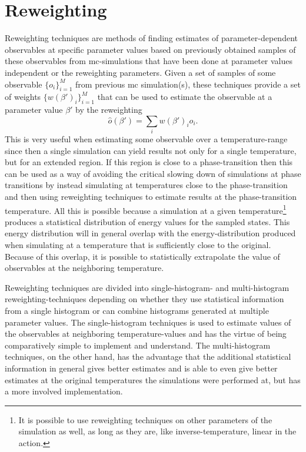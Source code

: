 \section{Reweighting}

Reweighting techniques are methods of finding estimates of parameter-dependent observables at specific parameter values based on previously obtained
samples of these observables from \ac{mc}-simulations that have been done at parameter values independent or the reweighting parameters.
Given a set of samples of some observable $\{o_i\}_{i=1}^M$ from previous \ac{mc} simulation(s), these techniques provide
a set of weights $\{w(\beta')_i\}_{i=1}^M$ that can be used to estimate the observable at a parameter value $\beta'$ by the reweighting
\begin{equation}
    \label{eq:Monte:Reweighting:generalReweighting}
    \hat{o}(\beta') = \sum_iw(\beta')_io_i.
\end{equation}
This is very useful when estimating some observable over a temperature-range since then a single simulation can yield results
not only for a single temperature, but for an extended region. If this region is close to a phase-transition then this can be used as a way of avoiding the
critical slowing down of simulations at phase transitions by instead simulating at temperatures close to the phase-transition and then using reweighting
techniques to estimate results at the phase-transition temperature. All this is possible because a simulation at a given temperature\footnote{It is possible
to use reweighting techniques on other parameters of the simulation as well, as long as they are, like inverse-temperature, linear in the action.}
produces a statistical distribution of energy values for the sampled states. This energy distribution will in general overlap with the energy-distribution
produced when simulating at a temperature that is sufficiently close to the original. Because of this overlap, it is possible to statistically extrapolate
the value of observables at the neighboring temperature.

Reweighting techniques are divided into single-histogram- and multi-histogram reweighting-techniques depending on whether they use statistical information
from a single histogram or can combine histograms generated at multiple parameter values. The single-histogram techniques is used to estimate values of the observables
at neighboring temperature-values and has the virtue of being comparatively simple to implement and understand. The multi-histogram
techniques, on the other hand, has the advantage that the additional statistical information in general gives better estimates and is able to even give better estimates
at the original temperatures the simulations were performed at, but has a more involved implementation.

